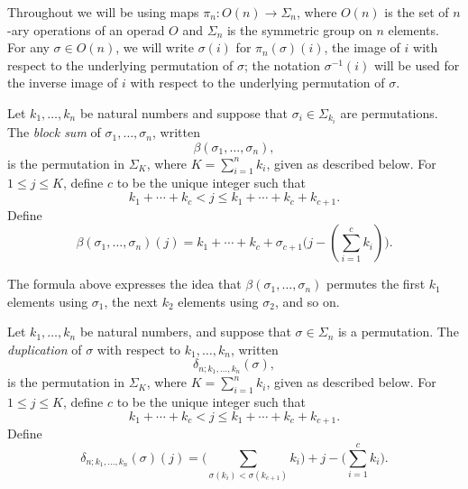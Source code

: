 \begin{nota}\label{nota:perm_shorthand}
Throughout we will be using maps $\pi_n \colon O(n) \rightarrow \Sigma_n$, where $O(n)$ is the set of $n$-ary operations of an operad $O$ and $\Sigma_n$ is the symmetric group on $n$ elements.  
For any $\sigma \in O(n)$, we will write $\sigma(i)$ for $\pi_n(\sigma)(i)$, the image of $i$ with respect to the underlying permutation of $\sigma$; the notation $\sigma^{-1}(i)$ will be used for the inverse image of $i$ with respect to the underlying permutation of $\sigma$.
\end{nota}



\begin{Defi}\label{Defi:beta-s}
Let $k_1, \ldots, k_n$ be natural numbers and suppose that $\sigma_i \in \Sigma_{k_i}$ are permutations. The \emph{block sum} of $\sigma_1, \ldots, \sigma_n$, written 
\[
\beta( \sigma_1, \ldots, \sigma_n ),
\]
is the permutation in $\Sigma_K$, where $K = \sum_{i=1}^n k_i$, given as described below. 
For $1 \leq j \leq K$, define $c$ to be the unique integer such that
\[
k_1 + \cdots + k_c < j \leq k_1 + \cdots + k_c +k_{c+1}.
\]
Define
\[
\beta( \sigma_1, \ldots, \sigma_n )(j) = k_1 + \cdots + k_c + \sigma_{c+1}\big( j - (\sum_{i=1}^c k_i) \big).
\]
\end{Defi}

\begin{rem}\label{rem:beta-s}
The formula above expresses the idea that $\beta( \sigma_1, \ldots, \sigma_n )$ permutes the first $k_1$ elements using $\sigma_1$, the next $k_2$ elements using $\sigma_2$, and so on.
\end{rem}

\begin{Defi}[(Duplication)]\label{Defi:delta-s}
Let $k_1, \ldots, k_n$ be natural numbers, and suppose that $\sigma \in \Sigma_n$ is a permutation. The \emph{duplication} of $\sigma$ with respect to $k_1, \ldots, k_n$, written
\[
\delta_{n; k_1, \ldots, k_n}(\sigma),
\]
is the permutation in $\Sigma_K$, where $K = \sum_{i=1}^n k_i$, given as described below. 
For $1 \leq j \leq K$, define $c$ to be the unique integer such that
\[
k_1 + \cdots + k_c < j \leq k_1 + \cdots + k_c +k_{c+1}.
\]
Define
\[
\delta_{n; k_1, \ldots, k_n}(\sigma)(j) = \big( \sum_{\sigma(k_i) < \sigma(k_{c+1})} k_i\big) + j - \big( \sum_{i=1}^c k_i \big).
\]
\end{Defi}

